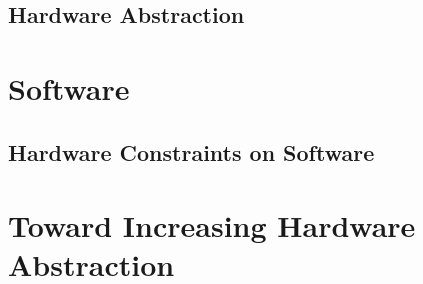 \documentclass[Nomencl]{SelimArticle}
\begin{document}
	\subsection{Hardware Abstraction}

\section{Software}

	\subsection{Hardware Constraints on Software}

\section{Toward Increasing Hardware Abstraction}

\section{}



\end{document}
